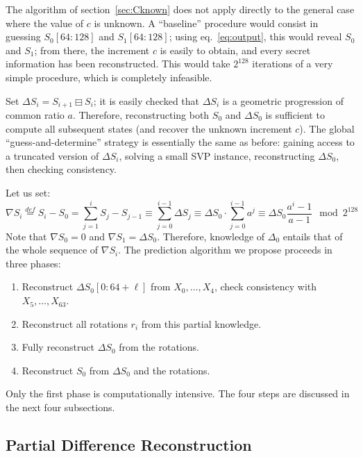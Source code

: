 \documentclass[submission,svgnames,journal=tosc]{iacrtrans}
\begin{document}
The algorithm of section~\ref{sec:Cknown} does not apply directly to the general
case where the value of $c$ is unknown. A ``baseline'' procedure would consist
in guessing $S_0[64:128]$ and $S_1[64:128]$; using eq.~\eqref{eq:output}, this
would reveal $S_0$ and $S_1$; from there, the increment $c$ is easily to obtain,
and every secret information has been reconstructed. This would take $2^{128}$
iterations of a very simple procedure, which is completely infeasible.

Set $\Delta S_i = S_{i+1} \boxminus S_i$; it is easily checked that $\Delta S_i$ is a
geometric progression of common ratio $a$. Therefore, reconstructing both $S_0$
and $\Delta S_0$ is sufficient to compute all subsequent states (and recover the
unknown increment $c$). The global ``guess-and-determine'' strategy is
essentially the same as before: gaining access to a truncated version of
$\Delta S_i$, solving a small SVP instance, reconstructing $\Delta S_0$, then
checking consistency.

Let us set:
\begin{equation}\label{eq:nabla}
  \nabla S_i \stackrel{def}{=} S_i - S_0 = \sum_{j=1}^i S_j - S_{j-1} \equiv \sum_{j=0}^{i-1} \Delta S_j \equiv \Delta S_0 \cdot \sum_{j=0}^{i-1} a^j \equiv \Delta S_0 \frac{a^i-1}{a-1} \mod 2^{128}
\end{equation}
Note that $\nabla S_0 = 0$ and $\nabla S_1 = \Delta S_0$. Therefore, knowledge
of $\Delta_0$ entails that of the whole sequence of $\nabla S_i$. The prediction
algorithm we propose proceeds in three phases:
\begin{enumerate}
\item Reconstruct $\Delta S_0[0:64+\ell]$ from $X_0, \dots, X_{4}$, check consistency with $X_5, \dots, X_{63}$.
\item Reconstruct all rotations $r_i$ from this partial knowledge.
\item Fully reconstruct $\Delta S_0$ from the rotations.
\item Reconstruct $S_0$ from $\Delta S_0$ and the rotations.
\end{enumerate}

\noindent Only the first phase is computationally intensive. The four steps are discussed in the next four subsections.

\subsection{Partial Difference Reconstruction}
\label{sec:cvp_small_2}
\end{document}
